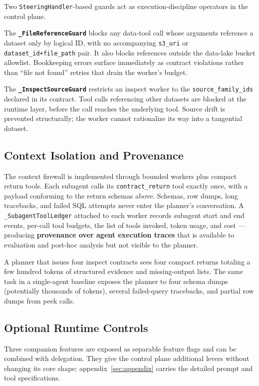 Two \texttt{SteeringHandler}-based guards act as execution-discipline operators in the control plane.

The \textbf{\texttt{\_FileReferenceGuard}} blocks any data-tool call whose arguments reference a dataset only by logical ID, with no accompanying \texttt{s3\_uri} or \texttt{dataset\_id+file\_path} pair. It also blocks references outside the data-lake bucket allowlist. Bookkeeping errors surface immediately as contract violations rather than ``file not found'' retries that drain the worker's budget.

The \textbf{\texttt{\_InspectSourceGuard}} restricts an inspect worker to the \texttt{source\_family\_ids} declared in its contract. Tool calls referencing other datasets are blocked at the runtime layer, before the call reaches the underlying tool. Source drift is prevented structurally; the worker cannot rationalize its way into a tangential dataset.

\subsection{Context Isolation and Provenance}

The context firewall is implemented through bounded workers plus compact return tools. Each subagent calls its \texttt{contract\_return} tool exactly once, with a payload conforming to the return schemas above. Schemas, row dumps, long tracebacks, and failed SQL attempts never enter the planner's conversation. A \texttt{\_SubagentToolLedger} attached to each worker records subagent start and end events, per-call tool budgets, the list of tools invoked, token usage, and cost --- producing \textbf{provenance over agent execution traces} that is available to evaluation and post-hoc analysis but not visible to the planner.

A planner that issues four inspect contracts sees four compact returns totaling a few hundred tokens of structured evidence and missing-output lists. The same task in a single-agent baseline exposes the planner to four schema dumps (potentially thousands of tokens), several failed-query tracebacks, and partial row dumps from peek calls.

\subsection{Optional Runtime Controls}

Three companion features are exposed as separable feature flags and can be combined with delegation. They give the control plane additional levers without changing its core shape; appendix~\ref{sec:appendix} carries the detailed prompt and tool specifications.

